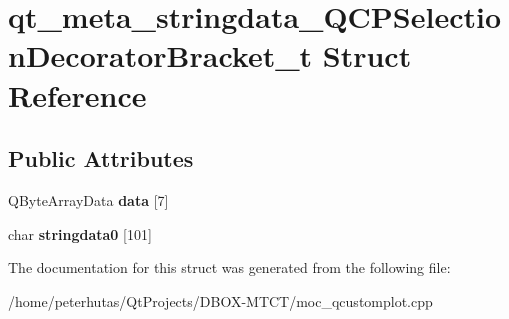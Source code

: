 \hypertarget{structqt__meta__stringdata___q_c_p_selection_decorator_bracket__t}{}\section{qt\+\_\+meta\+\_\+stringdata\+\_\+\+Q\+C\+P\+Selection\+Decorator\+Bracket\+\_\+t Struct Reference}
\label{structqt__meta__stringdata___q_c_p_selection_decorator_bracket__t}
\subsection*{Public Attributes}
\begin{DoxyCompactItemize}
\item 
\mbox{\label{structqt__meta__stringdata___q_c_p_selection_decorator_bracket__t_a3b64cfff2eed66fb56c3b3a8d04dbbbe}} 
Q\+Byte\+Array\+Data {\bfseries data} \mbox{[}7\mbox{]}
\item 
\mbox{\label{structqt__meta__stringdata___q_c_p_selection_decorator_bracket__t_a9fdc0589eeaa19fcf4e22afbdbd579cd}} 
char {\bfseries stringdata0} \mbox{[}101\mbox{]}
\end{DoxyCompactItemize}


The documentation for this struct was generated from the following file\+:\begin{DoxyCompactItemize}
\item 
/home/peterhutas/\+Qt\+Projects/\+D\+B\+O\+X-\/\+M\+T\+C\+T/moc\+\_\+qcustomplot.\+cpp\end{DoxyCompactItemize}

